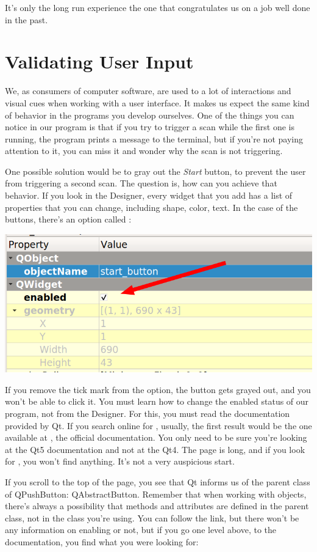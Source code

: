 It's only the long run experience the one that congratulates us on a job well done in the past.

\section{Validating User Input}\label{sec:validating-user-input}
We, as consumers of computer software, are used to a lot of interactions and visual cues when working with a user interface. It makes us expect the same kind of behavior in the programs you develop ourselves. One of the things you can notice in our program is that if you try to trigger a scan while the first one is running, the program prints a message to the terminal, but if you're not paying attention to it, you can miss it and wonder why the scan is not triggering.

One possible solution would be to gray out the \emph{Start} button, to prevent the user from triggering a second scan. The question is, how can you achieve that behavior. If you look in the Designer, every widget that you add has a list of properties that you can change, including shape, color, text. In the case of the buttons, there's an option called :

\begin{center}
    \includegraphics[width=.4\linewidth]{images/Chapter_09/10_enabled_button.png}
\end{center}

If you remove the tick mark from the option, the button gets grayed out, and you won't be able to click it. You must learn how to change the enabled status of our program, not from the Designer. For this, you must read the documentation provided by Qt. If you search online for , usually, the first result would be the one available at , the official documentation. You only need to be sure you're looking at the Qt5 documentation and not at the Qt4. The page is long, and if you look for , you won't find anything. It's not a very auspicious start.

If you scroll to the top of the page, you see that Qt informs us of the parent class of QPushButton: QAbstractButton. Remember that when working with objects, there's always a possibility that methods and attributes are defined in the parent class, not in the class you're using. You can follow the link, but there won't be any information on enabling or not, but if you go one level above, to the  documentation, you find what you were looking for:

